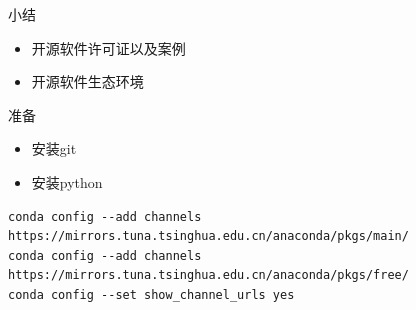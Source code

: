 \documentclass{beamer}
\begin{document}
\begin{frame}[t,fragile]{小结}
    \begin{itemize}
        \item 开源软件许可证以及案例
        \item 开源软件生态环境
    \end{itemize}

    \begin{block}
        {准备}
        \begin{itemize}
            \item 安装git
            \item 安装python
        \end{itemize}
        \tiny
        \begin{verbatim}
conda config --add channels https://mirrors.tuna.tsinghua.edu.cn/anaconda/pkgs/main/
conda config --add channels https://mirrors.tuna.tsinghua.edu.cn/anaconda/pkgs/free/
conda config --set show_channel_urls yes
        \end{verbatim}
    \end{block}
\end{frame}

\end{document}
